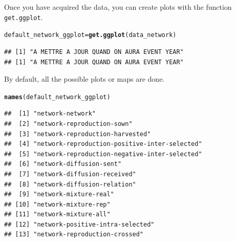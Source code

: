 \documentclass{article}\usepackage[]{graphicx}\usepackage[]{color}
\makeatletter
\newcommand{\hlstd}[1]{\textcolor[rgb]{0.345,0.345,0.345}{#1}}%
\newcommand{\hlkwb}[1]{\textcolor[rgb]{0.69,0.353,0.396}{#1}}%
\newcommand{\hlkwd}[1]{\textcolor[rgb]{0.737,0.353,0.396}{\textbf{#1}}}%
\newenvironment{kframe}{%
 \def\at@end@of@kframe{}%
 \ifinner\ifhmode%
  \def\at@end@of@kframe{\end{minipage}}%
  \begin{minipage}{\columnwidth}%
 \fi\fi%
 \def\FrameCommand##1{\hskip\@totalleftmargin \hskip-\fboxsep
 \colorbox{shadecolor}{##1}\hskip-\fboxsep
     \hskip-\linewidth \hskip-\@totalleftmargin \hskip\columnwidth}%
 \MakeFramed {\advance\hsize-\width
   \@totalleftmargin\z@ \linewidth\hsize
   \@setminipage}}%
 {\par\unskip\endMakeFramed%
 \at@end@of@kframe}
\newenvironment{knitrout}{}{} %
\makeatother
\begin{document}
Once you have acquired the data, you can create plots with the function \texttt{get.ggplot}.

\begin{knitrout}
\color{fgcolor}\begin{kframe}
\begin{alltt}
\hlstd{default_network_ggplot} \hlkwb{=} \hlkwd{get.ggplot}\hlstd{(data_network)}
\end{alltt}


{\ttfamily\noindent\itshape{}}\begin{verbatim}
## [1] "A METTRE A JOUR QUAND ON AURA EVENT YEAR"
## [1] "A METTRE A JOUR QUAND ON AURA EVENT YEAR"
\end{verbatim}
\end{kframe}
\end{knitrout}

By default, all the possible plots or maps are done.

\begin{knitrout}
\color{fgcolor}\begin{kframe}
\begin{alltt}
\hlkwd{names}\hlstd{(default_network_ggplot)}
\end{alltt}
\begin{verbatim}
##  [1] "network-network"                             
##  [2] "network-reproduction-sown"                   
##  [3] "network-reproduction-harvested"              
##  [4] "network-reproduction-positive-inter-selected"
##  [5] "network-reproduction-negative-inter-selected"
##  [6] "network-diffusion-sent"                      
##  [7] "network-diffusion-received"                  
##  [8] "network-diffusion-relation"                  
##  [9] "network-mixture-real"                        
## [10] "network-mixture-rep"                         
## [11] "network-mixture-all"                         
## [12] "network-positive-intra-selected"             
## [13] "network-reproduction-crossed"
\end{verbatim}
\end{kframe}
\end{knitrout}
\end{document}

